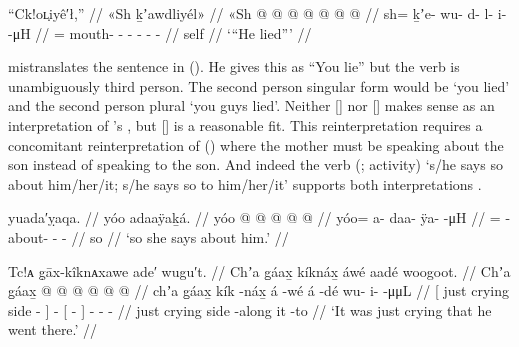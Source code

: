 \ex\label{ex:92-179-he-lied}%
%
\begingl
	\glpreamble	“Ck!oʟ̣iyê′ł,” //
	\glpreamble	«\!Sh ḵʼawdliyél\!» //
	\gla	«\!Sh @  @ {} @ {} @ {} @ {} @ {} @ {} //
	\glb	\pqp{}sh= ḵʼe- wu- d- l- i-  -μH //
	\glc	\pqp{}= mouth- - - - -
			 - //
	\gld	\pqp{}self  {} {} {} {} {} {} //
	\glft	‘“He lied”’
		//
\endgl
\xe

\citeauthor{swanton:1909} mistranslates the sentence in (\lastx).
He gives this as “You lie” but the verb  is unambiguously third person.
The second person singular form would be  ‘you lied’ and the second person plural  ‘you guys lied’. 
Neither  [] nor  [] makes sense as an interpretation of \citeauthor{swanton:1909}’s , but  [] is a reasonable fit.
This reinterpretation requires a concomitant reinterpretation of (\nextx) where the mother must be speaking about the son instead of speaking to the son.
And indeed the verb  (;  activity) ‘s/he says so about him/her/it; s/he says so to him/her/it’ supports both interpretations \parencite[858]{leer:1976}.

\ex\label{ex:92-180-so-she-says}%
%
\begingl
	\glpreamble	yuada′ỵaqa. //
	\glpreamble	yóo adaaÿaḵá. //
	\gla	yóo @  @ {} @ {} @ {} @ {} //
	\glb	yóo= a- daa- ÿa-  -μH //
	\glc	{}= - about- -  - //
	\gld	so  {} {} {} {} //
	\glft	‘so she says about him.’
		//
\endgl
\xe

\ex\label{ex:92-181-alongside-crying-he-went}%
%
\begingl
	\glpreamble	Tc!ᴀ g̣āx-kîknᴀxawe ade′ wugu′t. //
	\glpreamble	Chʼa g̱áax̱ kíknáx̱ áwé aadé woogoot. //
	\gla	{} Chʼa g̱áax̱  @ {} {}  @ {}
		{}  @ {} {}  @ {} @ {} @ {} //
	\glb	{} chʼa g̱áax̱ kík -náx̱ {} á -wé
		{} á -dé {} wu- i-  -μμL //
	\glc	{}[ just crying side - {}]  -
		{}[  - {}]
		- -  - //
	\gld	{} just crying side -along {}  {}
		{} it -to {}  {} {} {} //
	\glft	‘It was just crying that he went there.’
		//
\endgl
\xe

